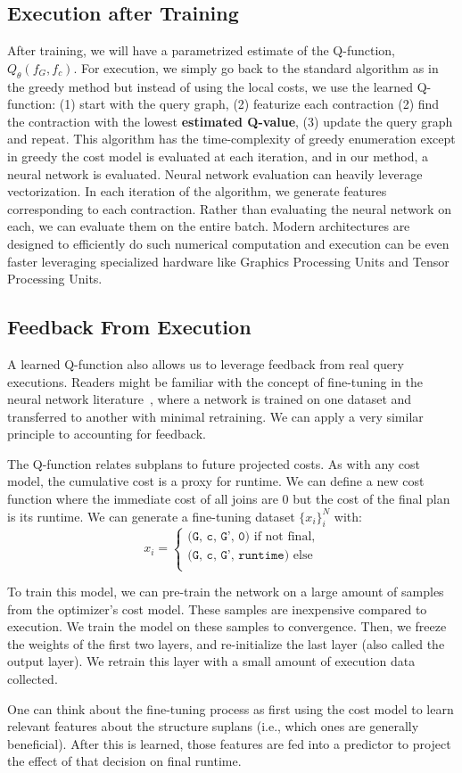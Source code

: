 \subsection{Execution after Training}
After training, we will have a parametrized estimate of the Q-function, $Q_\theta(f_G,f_c)$. For execution, we simply go back to the standard algorithm as in the greedy method but instead of using the local costs, we use the learned Q-function: (1) start with the query graph, (2) featurize each contraction (2) find the contraction with the lowest \textbf{estimated Q-value}, (3) update the query graph and repeat.
This algorithm has the time-complexity of greedy enumeration except in greedy the cost model is evaluated at each iteration, and in our method, a neural network is evaluated. Neural network evaluation can heavily leverage vectorization. In each iteration of the algorithm, we generate features corresponding to each contraction. Rather than evaluating the neural network on each, we can evaluate them on the entire batch. Modern architectures are designed to efficiently do such numerical computation and execution can be even faster leveraging specialized hardware like Graphics Processing Units and Tensor Processing Units.

\subsection{Feedback From Execution}
A learned Q-function also allows us to leverage feedback from real query executions.
Readers might be familiar with the concept of fine-tuning in the neural network literature~\cite{yosinski2014transferable}, where a network is trained on one dataset and transferred to another with minimal retraining.
We can apply a very similar principle to accounting for feedback.

The Q-function relates subplans to future projected costs.
As with any cost model, the cumulative cost is a proxy for runtime.
We can define a new cost function where the immediate cost of all joins are 0 but the cost of the final plan is its runtime.
We can generate a fine-tuning dataset $\{x_i\}_i^N$ with:
\[
x_i = \begin{cases}
\texttt{(G, c, G', 0)} \text{ if not final},\\
\texttt{(G, c, G',~runtime)} \text{ else}\\
\end{cases}
\]

To train this model, we can pre-train the network on a large amount of samples from the optimizer's cost model. 
These samples are inexpensive compared to execution.
We train the model on these samples to convergence.
Then, we freeze the weights of the first two layers, and re-initialize the last layer (also called the output layer).
We retrain this layer with a small amount of execution data collected.

One can think about the fine-tuning process as first using the cost model to learn relevant features about the structure suplans (i.e., which ones are generally beneficial). After this is learned, those features are fed into a predictor to project the effect of that decision on final runtime. 